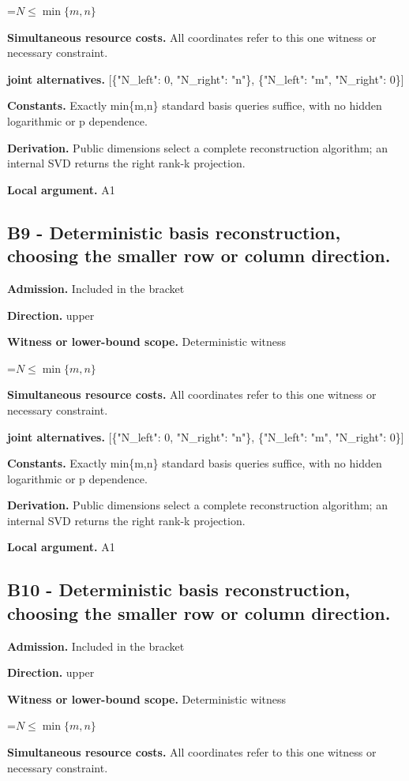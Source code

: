 \documentclass[10pt,a4paper]{article}
\newcommand{\AtlasMath}[1]{\par\begingroup\centering\setbox0=\hbox{$\displaystyle #1$}\ifdim\wd0>1.4\linewidth\typeout{ATLAS WIDE FORMULA: \the\wd0}\fi\ifdim\wd0>\linewidth\resizebox{\linewidth}{!}{\box0}\else\box0\fi\par\endgroup}
\begin{document}
\AtlasMath{N\le\min\{m,n\}}
\textbf{Simultaneous resource costs.} All coordinates refer to this one witness or necessary constraint.

\textbf{joint alternatives.} [\{"N\_left": 0, "N\_right": "n"\}, \{"N\_left": "m", "N\_right": 0\}]

\textbf{Constants.} Exactly min\{m,n\} standard basis queries suffice, with no hidden logarithmic or p dependence.

\textbf{Derivation.} Public dimensions select a complete reconstruction algorithm; an internal SVD returns the right rank-k projection.

\textbf{Local argument.} A1

\subsection{B9 - Deterministic basis reconstruction, choosing the smaller row or column direction.}
\textbf{Admission.} Included in the bracket

\textbf{Direction.} upper

\textbf{Witness or lower-bound scope.} Deterministic witness

\AtlasMath{N\le\min\{m,n\}}
\textbf{Simultaneous resource costs.} All coordinates refer to this one witness or necessary constraint.

\textbf{joint alternatives.} [\{"N\_left": 0, "N\_right": "n"\}, \{"N\_left": "m", "N\_right": 0\}]

\textbf{Constants.} Exactly min\{m,n\} standard basis queries suffice, with no hidden logarithmic or p dependence.

\textbf{Derivation.} Public dimensions select a complete reconstruction algorithm; an internal SVD returns the right rank-k projection.

\textbf{Local argument.} A1

\subsection{B10 - Deterministic basis reconstruction, choosing the smaller row or column direction.}
\textbf{Admission.} Included in the bracket

\textbf{Direction.} upper

\textbf{Witness or lower-bound scope.} Deterministic witness

\AtlasMath{N\le\min\{m,n\}}
\textbf{Simultaneous resource costs.} All coordinates refer to this one witness or necessary constraint.
\end{document}

